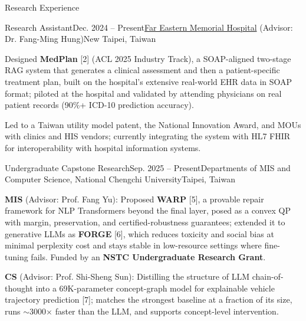 \documentclass{resume} %
\begin{document}
\begin{rSection}{Research Experience}
\begin{rSubsection}{Research Assistant}{Dec. 2024 -- Present}{\href{https://www.femh.org.tw/mainpage_en/Introduction.aspx}{Far Eastern Memorial Hospital} (Advisor: Dr. Fang-Ming Hung)}{New Taipei, Taiwan}
  \item Designed \textbf{MedPlan} [2] (ACL 2025 Industry Track), a SOAP-aligned two-stage RAG system that generates a clinical assessment and then a patient-specific treatment plan, built on the hospital's extensive real-world EHR data in SOAP format; piloted at the hospital and validated by attending physicians on real patient records (90\%+ ICD-10 prediction accuracy).
  \item Led to a Taiwan utility model patent, the National Innovation Award, and MOUs with clinics and HIS vendors; currently integrating the system with HL7 FHIR for interoperability with hospital information systems.
\end{rSubsection}

\begin{rSubsection}{Undergraduate Capstone Research}{Sep. 2025 -- Present}{Departments of MIS and Computer Science, National Chengchi University}{Taipei, Taiwan}
  \item \textbf{MIS} (Advisor: Prof. Fang Yu): Proposed \textbf{WARP} [5], a provable repair framework for NLP Transformers beyond the final layer, posed as a convex QP with margin, preservation, and certified-robustness guarantees; extended it to generative LLMs as \textbf{FORGE} [6], which reduces toxicity and social bias at minimal perplexity cost and stays stable in low-resource settings where fine-tuning fails. Funded by an \textbf{NSTC Undergraduate Research Grant}.
  \item \textbf{CS} (Advisor: Prof. Shi-Sheng Sun): Distilling the structure of LLM chain-of-thought into a 69K-parameter concept-graph model for explainable vehicle trajectory prediction [7]; matches the strongest baseline at a fraction of its size, runs $\sim$3000$\times$ faster than the LLM, and supports concept-level intervention.
\end{rSubsection}

\end{rSection}


\end{document}
